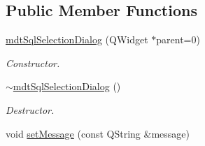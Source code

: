 \subsection*{Public Member Functions}
\begin{DoxyCompactItemize}
\item 
\hypertarget{classmdt_sql_selection_dialog_aaeb4d47e400bff8e58dec9f84f00517c}{
\hyperlink{classmdt_sql_selection_dialog_aaeb4d47e400bff8e58dec9f84f00517c}{mdtSqlSelectionDialog} (QWidget $\ast$parent=0)}
\label{classmdt_sql_selection_dialog_aaeb4d47e400bff8e58dec9f84f00517c}

\begin{DoxyCompactList}\small\item\em Constructor. \end{DoxyCompactList}\item 
\hypertarget{classmdt_sql_selection_dialog_a586e3cb812e5e9634f42cb40bfd2d724}{
\hyperlink{classmdt_sql_selection_dialog_a586e3cb812e5e9634f42cb40bfd2d724}{$\sim$mdtSqlSelectionDialog} ()}
\label{classmdt_sql_selection_dialog_a586e3cb812e5e9634f42cb40bfd2d724}

\begin{DoxyCompactList}\small\item\em Destructor. \end{DoxyCompactList}\item 
\hypertarget{classmdt_sql_selection_dialog_ab5ea543ebded60b4354c7c0902ca021f}{
void \hyperlink{classmdt_sql_selection_dialog_ab5ea543ebded60b4354c7c0902ca021f}{setMessage} (const QString \&message)}
\label{classmdt_sql_selection_dialog_ab5ea543ebded60b4354c7c0902ca021f}


\end{DoxyCompactItemize}
